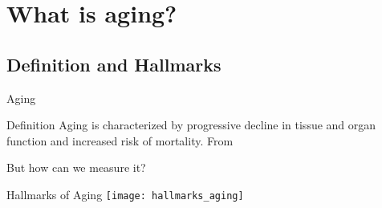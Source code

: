 \section{What is aging?}


\subsection{Definition and Hallmarks}

\begin{frame}[c]{Aging}
    \large

    \begin{block}{Definition}
        Aging is characterized by progressive decline in tissue and organ
        function and increased risk of mortality. From \cite{sen2016epigenetic}
    \end{block}
    \pause
    But how can we measure it?
\end{frame}


\begin{frame}[c]{Hallmarks of Aging}
    \texttt{[image: hallmarks\_aging]} \\
    \cite{lopez2013hallmarks}
\end{frame}



